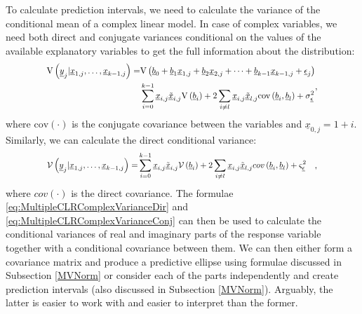 \documentclass[
]{book}
\begin{document}
To calculate prediction intervals, we need to calculate the variance of the conditional mean of a complex linear model. In case of complex variables, we need both direct and conjugate variances conditional on the values of the available explanatory variables to get the full information about the distribution:
\begin{equation}
    \resizebox{0.8\textwidth}{!}{$
    \begin{aligned}
    \mathrm{V}\left(\underline{y}_j | \underline{x}_{1,j}, \dots, \underline{x}_{k-1,j} \right) = & \mathrm{V}\left(\underline{b}_0 + \underline{b}_1 \underline{x}_{1,j} + \underline{b}_2 \underline{x}_{2,j} + \dots + \underline{b}_{k-1} \underline{x}_{k-1,j} + \underline{\epsilon}_j\right) \\
    & \sum_{i=0}^{k-1} \underline{x}_{i,j}\underline{\tilde{x}}_{i,j} \mathrm{V}\left(\underline{b}_i \right) + 2 \sum_{i\neq l} \underline{x}_{i,j}\underline{\tilde{x}}_{l,j} \mathrm{cov}\left(\underline{b}_i, \underline{b}_l \right) + \sigma_{\underline{\epsilon}}^2
    \end{aligned}, $}
    \label{eq:MultipleCLRComplexVarianceDir}
\end{equation}
where \(\mathrm{cov}(\cdot)\) is the conjugate covariance between the variables and \(\underline{x}_{0,j}=1+i\). Similarly, we can calculate the direct conditional variance:
\begin{equation}
    \resizebox{0.8\textwidth}{!}{$
    \begin{aligned}
    \mathcal{V}\left(\underline{y}_j | \underline{x}_{1,j}, \dots, \underline{x}_{k-1,j} \right) = & \sum_{i=0}^{k-1} \underline{x}_{i,j}\underline{\tilde{x}}_{i,j} \mathcal{V}\left(\underline{b}_i \right) + 2 \sum_{i\neq l} \underline{x}_{i,j}\underline{\tilde{x}}_{l,j} {cov}\left(\underline{b}_i, \underline{b}_l \right) + \varsigma_{\underline{\epsilon}}^2
    \end{aligned},$}
    \label{eq:MultipleCLRComplexVarianceConj}
\end{equation}
where \({cov}(\cdot)\) is the direct covariance. The formulae \eqref{eq:MultipleCLRComplexVarianceDir} and \eqref{eq:MultipleCLRComplexVarianceConj} can then be used to calculate the conditional variances of real and imaginary parts of the response variable together with a conditional covariance between them. We can then either form a covariance matrix and produce a predictive ellipse using formulae discussed in Subsection \ref{MVNorm} or consider each of the parts independently and create prediction intervals (also discussed in Subsection \ref{MVNorm}). Arguably, the latter is easier to work with and easier to interpret than the former.
\end{document}
